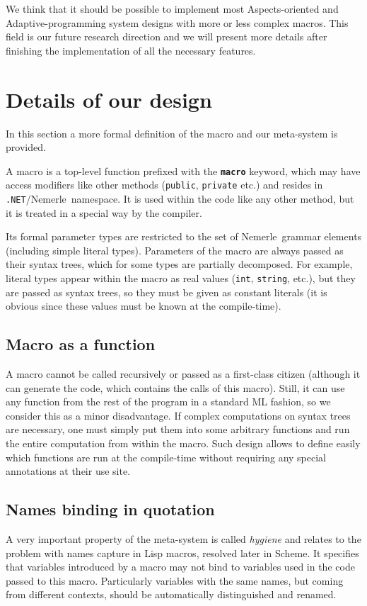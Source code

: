 \documentclass{llncs}
\newcommand{\net}[0]{{\tt .NET}}
\newcommand{\nem}[0]{Nemerle}
\newcommand{\kw}[1]{{\tt \bf #1}}
\begin{document}
We think that it should be possible to implement most Aspects-oriented
and Adaptive-programming system designs with more or less complex 
macros. This field is our future research direction and we will present
more details after finishing the implementation of all the necessary features.

\section{Details of our design}
In this section a more formal definition of the macro and our meta-system is provided.

A macro is a top-level function prefixed with the \kw{macro} keyword, 
which may have access modifiers like other methods (\verb,public,, \verb,private, etc.) 
and resides in \net/\nem\ namespace. It is used within the code like
any other method, but it is treated in a special way by the compiler.

Its formal parameter types are restricted to the set of \nem\
grammar elements (including simple literal types). Parameters of 
the macro are always passed as their syntax trees, which for some
types are partially decomposed. For example, literal types appear
within the macro as real values (\verb,int,, \verb,string,, etc.),
but they are passed
as syntax trees, so they must be given as constant literals (it is
obvious since these values must be known at the compile-time).

\subsection{Macro as a function}
A macro cannot be called recursively or passed as a first-class citizen
(although it can generate the code, which contains the calls of this macro).
Still, it can use any function from the rest of the program in a standard ML
fashion, so we consider this as a minor disadvantage. If complex 
computations on syntax trees are necessary, one must simply put them 
into some arbitrary functions and run the entire computation from within 
the macro. Such design allows to define easily which functions are run 
at the compile-time without requiring any special annotations at their use site.

\subsection{Names binding in quotation}
A very important property of the meta-system is called \emph{hygiene} 
and relates to the problem with names capture in Lisp macros, resolved 
later in Scheme. It specifies that variables introduced by a macro 
may not bind to variables used in the code passed to this macro. Particularly 
variables with the same names, but coming from different contexts, should be 
automatically distinguished and renamed.
\end{document}

